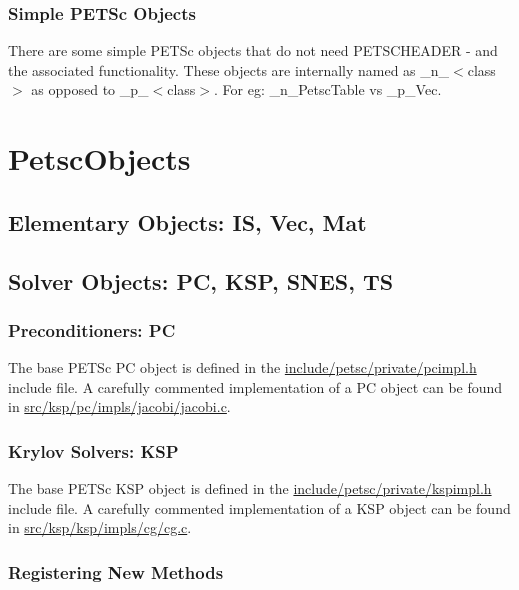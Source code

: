 \documentclass[twoside,12pt]{../sty/report_petsc}
\begin{document}
\subsection{Simple PETSc Objects}

There are some simple PETSc objects that do not need PETSCHEADER - and
the associated functionality. These objects are internally named as
\_n\_$<$class$>$ as opposed to \_p\_$<$class$>$. For eg: \_n\_PetscTable
vs \_p\_Vec.

\chapter{PetscObjects}

\section{Elementary Objects: IS, Vec, Mat}

\section{Solver Objects: PC, KSP, SNES, TS}

\subsection{Preconditioners: PC}

The base PETSc PC object is defined in the  \href{http://www.mcs.anl.gov/petsc/petsc-master/include/petsc/private/pcimpl.h.html}{include/petsc/private/pcimpl.h} include file.
A carefully commented implementation of a PC object can be found in
\href{http://www.mcs.anl.gov/petsc/petsc-master/src/ksp/pc/impls/jacobi/jacobi.c.html}{src/ksp/pc/impls/jacobi/jacobi.c}.


\subsection{Krylov Solvers: KSP}
The base PETSc KSP object is defined in the \href{http://www.mcs.anl.gov/petsc/petsc-master/include/petsc/private/kspimpl.h.html}{include/petsc/private/kspimpl.h} include file.
A carefully commented implementation of a KSP object can be found in
\href{http://www.mcs.anl.gov/petsc/petsc-master/src/ksp/ksp/impls/cg/cg.c.html}{src/ksp/ksp/impls/cg/cg.c}.

\subsection{Registering New Methods}
\label{sec:registeringnewmethods}
\end{document}
